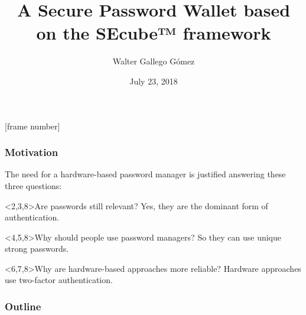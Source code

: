 \documentclass[14pt,usenames,dvipsnames]{beamer}
\title[About Beamer] %
{A Secure Password Wallet based on the SEcube™ framework}
\author %
{Walter Gallego Gómez}
\institute[VFU] %
{
 Department of control and computer engineering\\
Politecnico di Torino
}
\date[VLC 2014] %
{July 23, 2018}
\begin{document}
[frame number]{}


\frame{\titlepage}


\begin{frame}
\frametitle{Motivation}
The need for a hardware-based password manager is justified answering these three questions:


\begin{block}<2,3,8>{Are passwords still relevant?}
 {Yes, they are the dominant form of authentication.}
\end{block}

\begin{block}<4,5,8>{Why should people use password managers?}
 {So they can use unique strong passwords.}
\end{block}

\begin{block}<6,7,8>{Why are hardware-based approaches more reliable?}
 {Hardware approaches use two-factor authentication.}
\end{block}

%    
%
%    
%
%

\end{frame}



\begin{frame}
\frametitle{Outline}
\tableofcontents
\end{frame}
\end{document}
